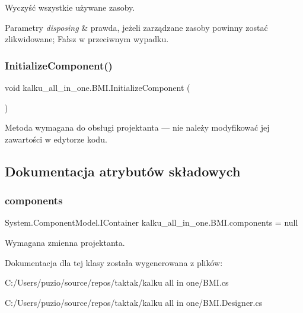 Wyczyść wszystkie używane zasoby. 


\begin{DoxyParams}{Parametry}
{\em disposing} & prawda, jeżeli zarządzane zasoby powinny zostać zlikwidowane; Fałsz w przeciwnym wypadku.\\
\hline
\end{DoxyParams}
\mbox{\label{classkalku__all__in__one_1_1_b_m_i_a02a0303e6c69bd4c1913bffeabb80f70}} 
\subsubsection{\texorpdfstring{InitializeComponent()}{InitializeComponent()}}
{\footnotesize\ttfamily void kalku\+\_\+all\+\_\+in\+\_\+one.\+B\+M\+I.\+Initialize\+Component (\begin{DoxyParamCaption}{ }\end{DoxyParamCaption})\hspace{0.3cm}{\ttfamily [private]}}



Metoda wymagana do obsługi projektanta — nie należy modyfikować jej zawartości w edytorze kodu. 



\subsection{Dokumentacja atrybutów składowych}
\mbox{\label{classkalku__all__in__one_1_1_b_m_i_a22ba14d3b8edf8bd543f0fb2aeeeb98f}} 
\subsubsection{\texorpdfstring{components}{components}}
{\footnotesize\ttfamily System.\+Component\+Model.\+I\+Container kalku\+\_\+all\+\_\+in\+\_\+one.\+B\+M\+I.\+components = null\hspace{0.3cm}{\ttfamily [private]}}



Wymagana zmienna projektanta. 



Dokumentacja dla tej klasy została wygenerowana z plików\+:\begin{DoxyCompactItemize}
\item 
C\+:/\+Users/puzio/source/repos/taktak/kalku all in one/B\+M\+I.\+cs\item 
C\+:/\+Users/puzio/source/repos/taktak/kalku all in one/B\+M\+I.\+Designer.\+cs\end{DoxyCompactItemize}
